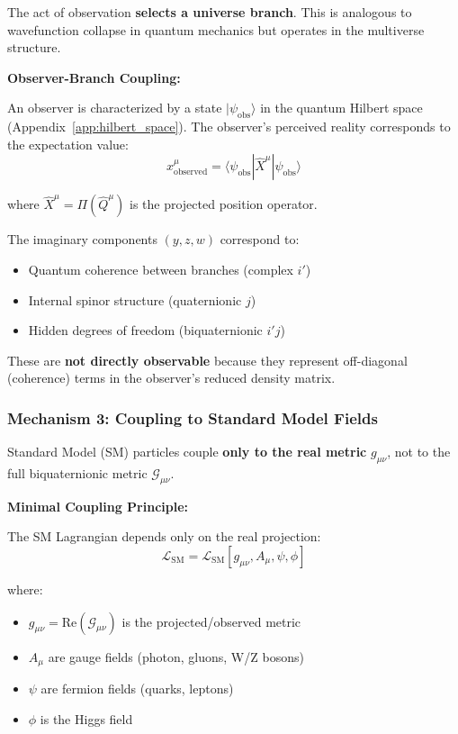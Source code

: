 The act of observation \textbf{selects a universe branch}. This is analogous to wavefunction collapse in quantum mechanics but operates in the multiverse structure.

\textbf{Observer-Branch Coupling:}

An observer is characterized by a state $|\psi_{\text{obs}}\rangle$ in the quantum Hilbert space (Appendix~\ref{app:hilbert_space}). The observer's perceived reality corresponds to the expectation value:
\begin{equation}
x^{\mu}_{\text{observed}} = \langle \psi_{\text{obs}} | \hat{X}^{\mu} | \psi_{\text{obs}} \rangle
\end{equation}

where $\hat{X}^{\mu} = \Pi(\hat{Q}^{\mu})$ is the projected position operator.

The imaginary components $(y, z, w)$ correspond to:
\begin{itemize}
\item Quantum coherence between branches (complex $i'$)
\item Internal spinor structure (quaternionic $j$)
\item Hidden degrees of freedom (biquaternionic $i'j$)
\end{itemize}

These are \textbf{not directly observable} because they represent off-diagonal (coherence) terms in the observer's reduced density matrix.

\subsubsection{Mechanism 3: Coupling to Standard Model Fields}

Standard Model (SM) particles couple \textbf{only to the real metric} $g_{\mu\nu}$, not to the full biquaternionic metric $\mathcal{G}_{\mu\nu}$.

\textbf{Minimal Coupling Principle:}

The SM Lagrangian depends only on the real projection:
\begin{equation}
\mathcal{L}_{\text{SM}} = \mathcal{L}_{\text{SM}}[g_{\mu\nu}, A_{\mu}, \psi, \phi]
\end{equation}

where:
\begin{itemize}
\item $g_{\mu\nu} = \text{Re}(\mathcal{G}_{\mu\nu})$ is the projected/observed metric
\item $A_{\mu}$ are gauge fields (photon, gluons, W/Z bosons)
\item $\psi$ are fermion fields (quarks, leptons)
\item $\phi$ is the Higgs field
\end{itemize}

